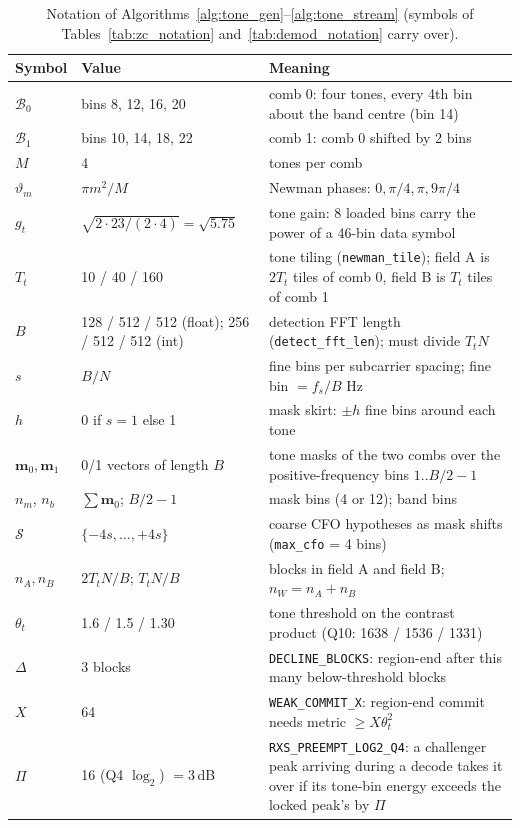 \begin{table}[H]
    \centering
    \caption{Notation of Algorithms~\ref{alg:tone_gen}--\ref{alg:tone_stream}
             (symbols of Tables~\ref{tab:zc_notation} and~\ref{tab:demod_notation}
             carry over).}
    \label{tab:tone_notation}
    \small
    \begin{tabular}{@{}lp{3.6cm}p{8.2cm}@{}}
    \toprule
    \textbf{Symbol} & \textbf{Value} & \textbf{Meaning} \\
    \midrule
    $\mathcal{B}_0$ & bins 8, 12, 16, 20 & comb 0: four tones, every 4th bin about the band centre (bin 14) \\
    $\mathcal{B}_1$ & bins 10, 14, 18, 22 & comb 1: comb 0 shifted by 2 bins \\
    $M$ & 4 & tones per comb \\
    $\vartheta_m$ & $\pi m^2 / M$ & Newman phases: $0, \pi/4, \pi, 9\pi/4$ \\
    $g_t$ & $\sqrt{2 \cdot 23 / (2 \cdot 4)} = \sqrt{5.75}$ & tone gain: 8 loaded bins carry the power of a 46-bin data symbol \\
    $T_t$ & 10 / 40 / 160 & tone tiling (\texttt{newman\_tile}); field A is $2T_t$ tiles of comb 0, field B is $T_t$ tiles of comb 1 \\
    $B$ & 128 / 512 / 512 (float); 256 / 512 / 512 (int) & detection FFT length (\texttt{detect\_fft\_len}); must divide $T_t N$ \\
    $s$ & $B/N$ & fine bins per subcarrier spacing; fine bin $= f_s/B$ Hz \\
    $h$ & 0 if $s = 1$ else 1 & mask skirt: $\pm h$ fine bins around each tone \\
    $\mathbf{m}_0, \mathbf{m}_1$ & 0/1 vectors of length $B$ & tone masks of the two combs over the positive-frequency bins $1..B/2{-}1$ \\
    $n_m$, $n_b$ & $\sum \mathbf{m}_0$; $B/2 - 1$ & mask bins (4 or 12); band bins \\
    $\mathcal{S}$ & $\{-4s, \ldots, +4s\}$ & coarse CFO hypotheses as mask shifts (\texttt{max\_cfo} = 4 bins) \\
    $n_A, n_B$ & $2T_tN/B$; $T_tN/B$ & blocks in field A and field B; $n_W = n_A + n_B$ \\
    $\theta_t$ & 1.6 / 1.5 / 1.30 & tone threshold on the contrast product (Q10: 1638 / 1536 / 1331) \\
    $\Delta$ & 3 blocks & \texttt{DECLINE\_BLOCKS}: region-end after this many below-threshold blocks \\
    $X$ & 64 & \texttt{WEAK\_COMMIT\_X}: region-end commit needs metric $\ge X\theta_t^2$ \\
    $\Pi$ & 16 (Q4 $\log_2$) $= 3$\,dB & \texttt{RXS\_PREEMPT\_LOG2\_Q4}: a challenger peak arriving during a decode takes it over if its tone-bin energy exceeds the locked peak's by $\Pi$ \\
    \bottomrule
    \end{tabular}
\end{table}

